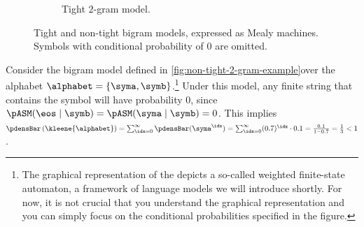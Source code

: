 \begin{figure}[ht]
\begin{subfigure}{0.7\textwidth}
{          
        }
         \caption{Tight $2$-gram model.}
         \label{fig:tight-2-gram-example}
    \end{subfigure}
    \caption{Tight and non-tight bigram models, expressed as Mealy machines. 
    Symbols with conditional probability of 0 are omitted.}
\end{figure}

\begin{example} \label{ex:non-tight-2-gram}
Consider the bigram model defined in \cref{fig:non-tight-2-gram-example}over the alphabet $\alphabet = \{\syma, \symb\}$.\footnote{The graphical representation of the \autoregmodelAcronym depicts a so-called weighted finite-state automaton, a framework of language models we will introduce shortly. For now, it is not crucial that you understand the graphical representation and you can simply focus on the conditional probabilities specified in the figure.} 
Under this model, any finite string that contains the symbol \symb{} will have probability 0, since $\pASM(\eos\mid\symb)=\pASM(\syma\mid\symb)=0$. This implies $\pdensBar\left(\kleene{\alphabet}\right) = \sum_{\idx=0}^\infty \pdensBar(\syma^\idx) = \sum_{\idx=0}^\infty (0.7)^\idx \cdot 0.1 = \frac{0.1}{1 - 0.7} = \frac{1}{3} < 1$.
\end{example}

